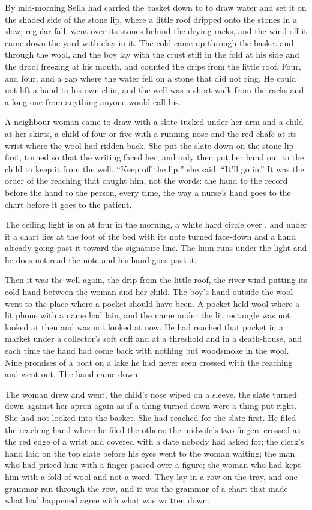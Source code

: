 \scenebreak

By mid-morning Sella had carried the basket down to  to draw water and set it on the shaded side of the stone lip, where a little roof dripped onto the stones in a slow, regular fall.  went over its stones behind the drying racks, and the wind off it came down the yard with clay in it. The cold came up through the basket and through the wool, and the boy lay with the crust stiff in the fold at his side and the drool freezing at his mouth, and counted the drips from the little roof. Four, and four, and a gap where the water fell on a stone that did not ring. He could not lift a hand to his own chin, and the well was a short walk from the racks and a long one from anything anyone would call his.

A neighbour woman came to draw with a slate tucked under her arm and a child at her skirts, a child of four or five with a running nose and the red chafe at its wrist where the wool had ridden back. She put the slate down on the stone lip first, turned so that the writing faced her, and only then put her hand out to the child to keep it from the well. “Keep off the lip,” she said. “It'll go in.” It was the order of the reaching that caught him, not the words: the hand to the record before the hand to the person, every time, the way a nurse's hand goes to the chart before it goes to the patient.

The ceiling light is on at four in the morning, a white hard circle over , and under it a chart lies at the foot of the bed with its note turned face-down and a hand already going past it toward the signature line. The hum runs under the light and he does not read the note and his hand goes past it.

Then it was the well again, the drip from the little roof, the river wind putting its cold hand between the woman and her child. The boy's hand outside the wool went to the place where a pocket should have been. A pocket held wool where a lit phone with a name had lain, and the name under the lit rectangle was not looked at then and was not looked at now. He had reached that pocket in a market under a collector's soft cuff and at a threshold and in a death-house, and each time the hand had come back with nothing but woodsmoke in the wool. Nine promises of a boat on a lake he had never seen crossed with the reaching and went out. The hand came down.

The woman drew and went, the child's nose wiped on a sleeve, the slate turned down against her apron again as if a thing turned down were a thing put right. She had not looked into the basket. She had reached for the slate first. He filed the reaching hand where he filed the others: the midwife's two fingers crossed at the red edge of a wrist and covered with a date nobody had asked for; the clerk's hand laid on the top slate before his eyes went to the woman waiting; the man who had priced him with a finger passed over a figure; the woman who had kept him with a fold of wool and not a word. They lay in a row on the tray, and one grammar ran through the row, and it was the grammar of a chart that made what had happened agree with what was written down.

